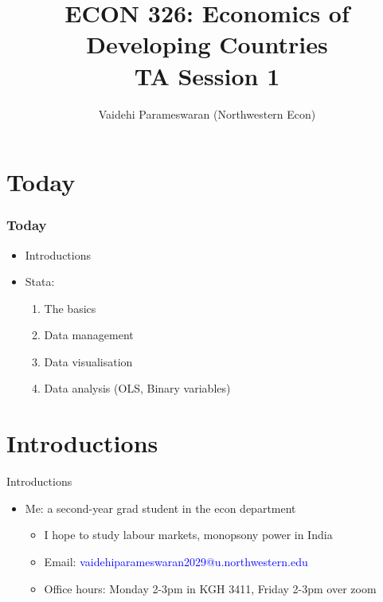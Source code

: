 \documentclass[11pt,notes=hide,aspectratio=169,mathserif]{beamer}
\title[class]{ECON 326: Economics of Developing Countries \\ TA Session 1}
\author[vaidehi's class ]{Vaidehi Parameswaran (Northwestern Econ)}
\date{\monthname[\the\month] \the\year}
\begin{document}
\begin{frame}[plain]
\titlepage
\end{frame}

\section{Today}
\begin{frame}
    
\frametitle{Today}
\begin{itemize}
\vspace{-.3cm}
\item Introductions 
\medskip
\item Stata: \smallskip
\begin{enumerate}
    \item The basics
    \smallskip
    \item Data management
    \item Data visualisation
    \item Data analysis (OLS, Binary variables)
\end{enumerate}
\end{itemize}
\end{frame}

\section{Introductions}
\begin{frame}{Introductions}
\begin{itemize}
\item Me: a second-year grad student in the econ department 
\begin{itemize}
        \item I hope to study labour markets, monopsony power in India 
        \item Email: \textcolor{blue}{vaidehiparameswaran2029@u.northwestern.edu} 
        \item Office hours: Monday 2-3pm in KGH 3411, Friday 2-3pm over zoom
\end{itemize}
\end{itemize}
\end{frame}
\end{document}

